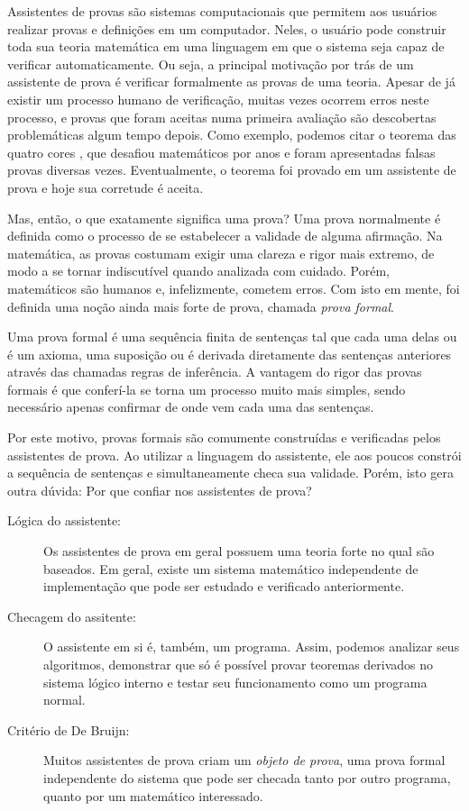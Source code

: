 Assistentes de provas são sistemas computacionais que permitem aos usuários
realizar provas e definições em um computador. Neles, o usuário pode construir
toda sua teoria matemática em uma linguagem em que o sistema seja capaz de
verificar automaticamente. Ou seja, a principal motivação por trás de um
assistente de prova é verificar formalmente as provas de uma teoria. Apesar de
já existir um processo humano de verificação, muitas vezes ocorrem erros neste
processo, e provas que foram aceitas numa primeira avaliação são descobertas
problemáticas algum tempo depois. Como exemplo, podemos citar o teorema das
quatro cores \cite{four_colour}, que desafiou matemáticos por anos e foram
apresentadas falsas provas diversas vezes. Eventualmente, o teorema foi provado
em um assistente de prova e hoje sua corretude é aceita.

Mas, então, o que exatamente significa uma prova? Uma prova normalmente é
definida como o processo de se estabelecer a validade de alguma afirmação. Na
matemática, as provas costumam exigir uma clareza e rigor mais extremo, de modo
a se tornar indiscutível quando analizada com cuidado. Porém, matemáticos são
humanos e, infelizmente, cometem erros. Com isto em mente, foi definida uma
noção ainda mais forte de prova, chamada \emph{prova formal}.

Uma prova formal é uma sequência finita de sentenças tal que cada uma delas ou é
um axioma, uma suposição ou é derivada diretamente das sentenças anteriores
através das chamadas regras de inferência. A vantagem do rigor das provas
formais é que conferí-la se torna um processo muito mais simples, sendo
necessário apenas confirmar de onde vem cada uma das sentenças.

Por este motivo, provas formais são comumente construídas e verificadas pelos
assistentes de prova. Ao utilizar a linguagem do assistente, ele aos poucos
constrói a sequência de sentenças e simultaneamente checa sua validade. Porém,
isto gera outra dúvida: Por que confiar nos assistentes de prova?


\begin{description}
    \item[Lógica do assistente:] Os assistentes de prova em geral possuem uma
        teoria forte no qual são baseados. Em geral, existe um sistema
        matemático independente de implementação que pode ser estudado e
        verificado anteriormente.
    \item[Checagem do assitente:] O assistente em si é, também, um programa. Assim,
        podemos analizar seus algoritmos, demonstrar que só é possível provar
        teoremas derivados no sistema lógico interno e testar seu funcionamento
        como um programa normal.
    \item[Critério de De Bruijn:] Muitos assistentes de prova criam um
        \emph{objeto de prova}, uma prova formal independente do sistema que
        pode ser checada tanto por outro programa, quanto por um matemático
        interessado.  
\end{description}

